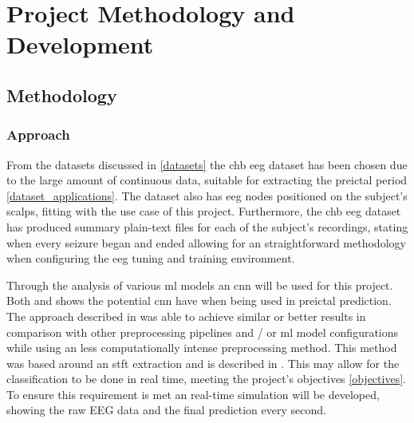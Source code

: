 \documentclass[12pt]{article}
\begin{document}
\section{Project Methodology and Development}\label{development}

\subsection{Methodology}

\subsubsection{Approach}

From the datasets discussed in \ref{datasets} the \acrfull{chb} \acrshort{eeg} dataset has been chosen due to the large amount of continuous data, suitable for extracting the preictal period \ref{dataset_applications}. The dataset also has \acrshort{eeg} nodes positioned on the subject's scalps, fitting with the use case of this project. Furthermore, the \acrshort{chb} \acrshort{eeg} dataset has produced summary plain-text files for each of the subject's recordings, stating when every seizure began and ended allowing for an straightforward methodology when configuring the \acrshort{eeg} tuning and training environment. 

Through the analysis of various \acrshort{ml} models an \acrshort{cnn} will be used for this project. Both \cite{truong2018convolutional} and \cite{mirowski2009classification} shows the potential \acrshort{cnn} have when being used in preictal prediction. The approach described in \cite{truong2018convolutional} was able to achieve similar or better results in comparison with other preprocessing pipelines and / or \acrshort{ml} model configurations while using an less computationally intense preprocessing method. This method was based around an \acrshort{stft} extraction and is described in \cite{truong2018convolutional}. This may allow for the classification to be done in real time, meeting the project's objectives \ref{objectives}. To ensure this requirement is met an real-time simulation will be developed, showing the raw EEG data and the final prediction every second. 
\end{document}
